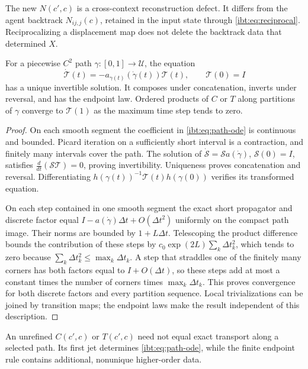 The new $N(c',c)$ is a cross-context reconstruction defect. It differs from the agent backtrack $N_{ij,j}(c)$, retained in the input state through \cref{ibt:eq:reciprocal}. Reciprocalizing a displacement map does not delete the backtrack data that determined $X$.

For a piecewise $C^2$ path $\gamma:[0,1]\to\mathcal U$, the equation
\begin{equation}
 \dot{\mathcal T}(t)=-a_{\gamma(t)}(\dot\gamma(t))\mathcal T(t),\qquad
 \mathcal T(0)=I
 \label{ibt:eq:path-ode}
\end{equation}
has a unique invertible solution. It composes under concatenation, inverts under reversal, and has the endpoint law. Ordered products of $C$ or $T$ along partitions of $\gamma$ converge to $\mathcal T(1)$ as the maximum time step tends to zero.
\begin{proof}
On each smooth segment the coefficient in \cref{ibt:eq:path-ode} is continuous and bounded. Picard iteration on a sufficiently short interval is a contraction, and finitely many intervals cover the path. The solution of $\dot{\mathcal S}=\mathcal Sa(\dot\gamma)$, $\mathcal S(0)=I$, satisfies $\frac{d}{d t}(\mathcal S\mathcal T)=0$, proving invertibility. Uniqueness proves concatenation and reversal. Differentiating $h(\gamma(t))^{-1}\mathcal T(t)h(\gamma(0))$ verifies its transformed equation.

On each step contained in one smooth segment the exact short propagator and discrete factor equal $I-a(\dot\gamma)\Delta t+O(\Delta t^2)$ uniformly on the compact path image. Their norms are bounded by $1+L\Delta t$. Telescoping the product difference bounds the contribution of these steps by $c_0\exp(2L)\sum_k\Delta t_k^2$, which tends to zero because $\sum_k\Delta t_k^2\leq\max_k\Delta t_k$. A step that straddles one of the finitely many corners has both factors equal to $I+O(\Delta t)$, so these steps add at most a constant times the number of corners times $\max_k\Delta t_k$. This proves convergence for both discrete factors and every partition sequence. Local trivializations can be joined by transition maps; the endpoint laws make the result independent of this description.
\end{proof}

An unrefined $C(c',c)$ or $T(c',c)$ need not equal exact transport along a selected path. Its first jet determines \cref{ibt:eq:path-ode}, while the finite endpoint rule contains additional, nonunique higher-order data.

